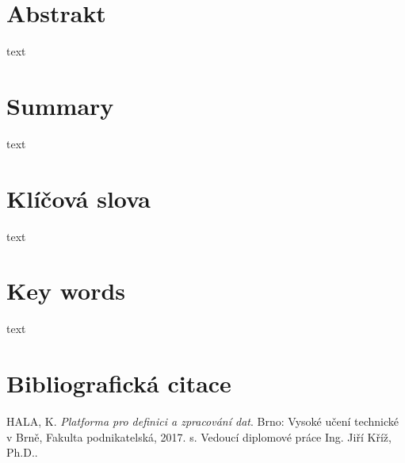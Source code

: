 \documentclass[12pt,oneside,a4paper]{report}
\newcommand\blankpage{
    \null
    \thispagestyle{empty}
    \newpage
}
\begin{document}
\afterpage{\blankpage}

\pagestyle{empty}



\section*{Abstrakt}
text
\section*{Summary}
text

\hbox{}
\vfill

\section*{Klíčová slova}
text
\section*{Key words}
text
\vskip1cm

\newpage
\hbox{}
\vfill

\section*{Bibliografická citace}
HALA, K. \textit{Platforma pro definici a zpracování dat}. Brno: Vysoké učení technické v Brně, Fakulta podnikatelská, 2017. \pageref*{LastPage} s. Vedoucí diplomové práce Ing. Jiří Kříž, Ph.D..
\vskip1cm
\end{document}
